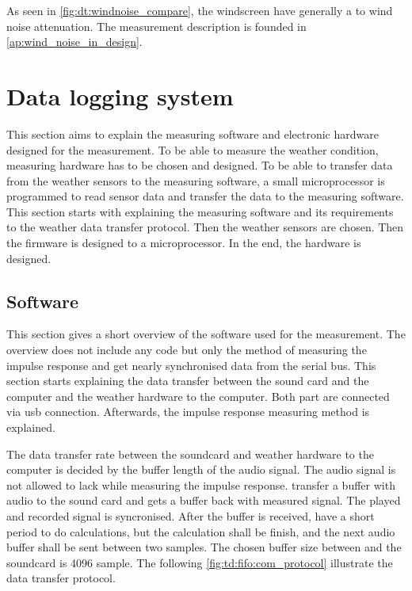
As seen in \autoref{fig:dt:windnoise_compare}, the windscreen have generally a  to  wind noise attenuation. The measurement description is founded in \autoref{ap:wind_noise_in_design}. 



\section{Data logging system}\label{sec:data_log_sys}
This section aims to explain the measuring software and electronic hardware designed for the measurement. To be able to measure the weather condition, measuring hardware has to be chosen and designed. To be able to transfer data from the weather sensors to the measuring software, a small microprocessor is programmed to read sensor data and transfer the data to the measuring software. This section starts with explaining the measuring software and its requirements to the weather data transfer protocol. Then the weather sensors are chosen. Then the firmware is designed to a microprocessor. In the end, the hardware is designed.

\subsection{Software}
This section gives a short overview of the \matlab software used for the measurement. The overview does not include any code but only the method of measuring the impulse response and get nearly synchronised data from the serial bus. This section starts explaining the data transfer between the sound card and the computer and the weather hardware to the computer. Both part are connected via \gls{usb} connection. Afterwards, the impulse response measuring method is explained.

The data transfer rate between the soundcard and weather hardware to the computer is decided by the buffer length of the audio signal. The audio signal is not allowed to lack while measuring the impulse response. \matlab transfer a buffer with audio to the sound card and gets a buffer back with measured signal. The played and recorded signal is syncronised. After the buffer is received, \matlab have a short period to do calculations, but the calculation shall be finish, and the next audio buffer shall be sent between two samples.  The chosen buffer size between \matlab and the soundcard is 4096 sample. The following \autoref{fig:td:fifo:com_protocol} illustrate the data transfer protocol.

